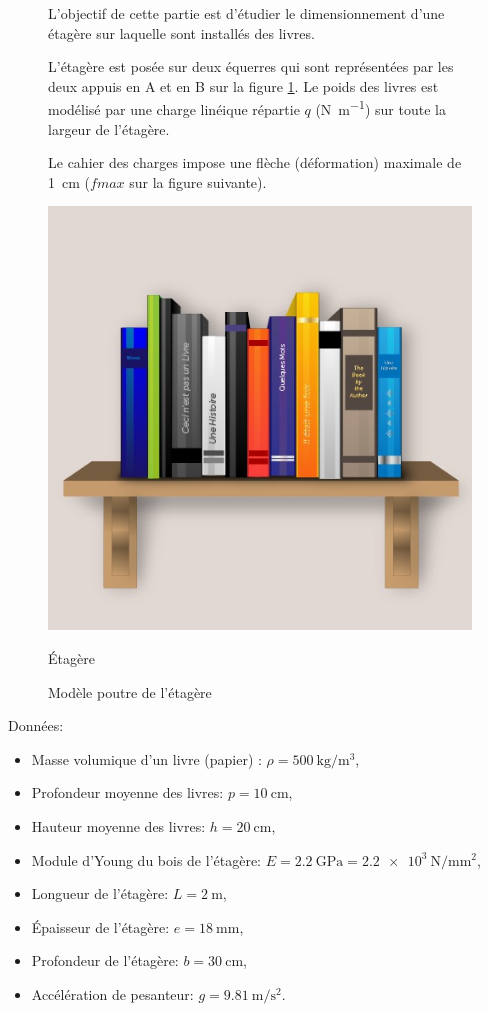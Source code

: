 \begin{figure}[ht!]
\begin{minipage}{0.5\linewidth}
L'objectif de cette partie est d'étudier le dimensionnement d'une étagère sur laquelle sont installés des livres.

L'étagère est posée sur deux équerres qui sont représentées par les deux appuis en A et en B sur la figure \ref{modele_poutre}. Le poids des livres est modélisé par une charge linéique répartie $q$ (\si{\newton\per\meter}) sur toute la largeur de l'étagère.

Le cahier des charges impose une flèche (déformation) maximale de \SI{1}{\centi\meter} ($fmax$ sur la figure suivante).

\end{minipage}\hfill
\begin{minipage}{0.5\linewidth}
  \begin{center}
   \includegraphics[width=0.5\linewidth]{img/Etagere}
  \end{center}
  \caption{Étagère}
  \label{etagere}
\end{minipage}

 \begin{center}
  \def\svgwidth{0.8\linewidth}
  \Large{
  }
 \end{center}
 \caption{Modèle poutre de l'étagère}
 \label{modele_poutre}
\end{figure}

Données:
\begin{itemize}
 \item Masse volumique d'un livre (papier) : $\rho=\SI{500}{\kilo\gram\per\meter\cubed}$,
 \item Profondeur moyenne des livres: $p=\SI{10}{\centi\meter}$,
 \item Hauteur moyenne des livres: $h=\SI{20}{\centi\meter}$,
 \item Module d'Young du bois de l'étagère: $E=\SI{2,2}{\giga\pascal}=\SI{2,2e3}{\newton\per\milli\meter\squared}$,
 \item Longueur de l'étagère: $L=\SI{2}{\meter}$,
 \item Épaisseur de l'étagère: $e=\SI{18}{\milli\meter}$,
 \item Profondeur de l'étagère: $b=\SI{30}{\centi\meter}$,
 \item Accélération de pesanteur: $g=\SI{9,81}{\meter\per\second\squared}$.
\end{itemize}


